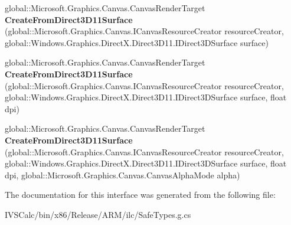 \begin{DoxyCompactItemize}
\item 
\mbox{\label{interface_microsoft_1_1_graphics_1_1_canvas_1_1_i_canvas_render_target_statics_a2d0a325b04d1c79f55549238fdde4934}} 
global\+::\+Microsoft.\+Graphics.\+Canvas.\+Canvas\+Render\+Target {\bfseries Create\+From\+Direct3\+D11\+Surface} (global\+::\+Microsoft.\+Graphics.\+Canvas.\+I\+Canvas\+Resource\+Creator resource\+Creator, global\+::\+Windows.\+Graphics.\+Direct\+X.\+Direct3\+D11.\+I\+Direct3\+D\+Surface surface)
\item 
\mbox{\label{interface_microsoft_1_1_graphics_1_1_canvas_1_1_i_canvas_render_target_statics_a4edef1637b0e569998765e88f846b084}} 
global\+::\+Microsoft.\+Graphics.\+Canvas.\+Canvas\+Render\+Target {\bfseries Create\+From\+Direct3\+D11\+Surface} (global\+::\+Microsoft.\+Graphics.\+Canvas.\+I\+Canvas\+Resource\+Creator resource\+Creator, global\+::\+Windows.\+Graphics.\+Direct\+X.\+Direct3\+D11.\+I\+Direct3\+D\+Surface surface, float dpi)
\item 
\mbox{\label{interface_microsoft_1_1_graphics_1_1_canvas_1_1_i_canvas_render_target_statics_a8416b671ded635e82d95a7581e4d8d67}} 
global\+::\+Microsoft.\+Graphics.\+Canvas.\+Canvas\+Render\+Target {\bfseries Create\+From\+Direct3\+D11\+Surface} (global\+::\+Microsoft.\+Graphics.\+Canvas.\+I\+Canvas\+Resource\+Creator resource\+Creator, global\+::\+Windows.\+Graphics.\+Direct\+X.\+Direct3\+D11.\+I\+Direct3\+D\+Surface surface, float dpi, global\+::\+Microsoft.\+Graphics.\+Canvas.\+Canvas\+Alpha\+Mode alpha)
\end{DoxyCompactItemize}


The documentation for this interface was generated from the following file\+:\begin{DoxyCompactItemize}
\item 
I\+V\+S\+Calc/bin/x86/\+Release/\+A\+R\+M/ilc/Safe\+Types.\+g.\+cs\end{DoxyCompactItemize}
